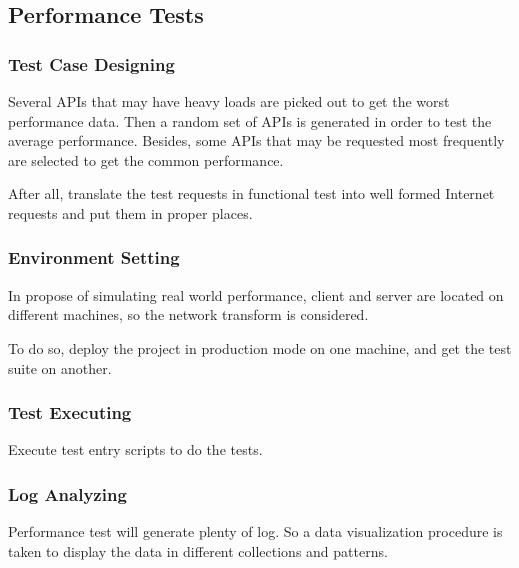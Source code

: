   \subsection{Performance Tests}
    \subsubsection{Test Case Designing}
      Several APIs that may have heavy loads are picked out to get the worst performance data.
      Then a random set of APIs is generated in order to test the average performance.
      Besides, some APIs that may be requested most frequently are selected to get the common performance.

      After all, translate the test requests in functional test into well formed Internet requests
      and put them in proper places.
    \subsubsection{Environment Setting}
      In propose of simulating real world performance,
      client and server are located on different machines, so the network transform is considered.

      To do so, deploy the project in production mode on one machine, and get the test suite on another.
    \subsubsection{Test Executing}
      Execute test entry scripts to do the tests.
    \subsubsection{Log Analyzing}
      Performance test will generate plenty of log.
      So a data visualization procedure is taken to display the data in different collections and patterns.

